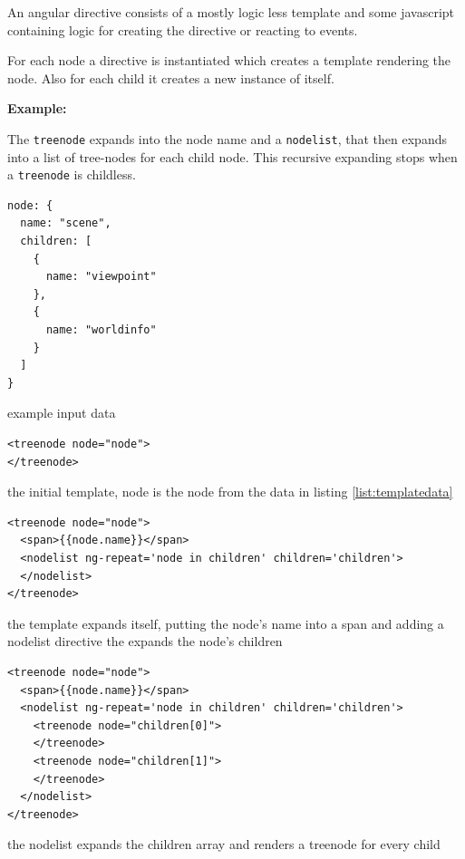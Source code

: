 An angular directive consists of a mostly logic less template and some
javascript containing logic for creating the directive or reacting to
events.

For each node a directive is instantiated which creates a template
rendering the node. Also for each child it creates a new instance of
itself.

\textbf{Example:}

The \texttt{treenode} expands into the node name and a \texttt{nodelist},
that then expands into a list of tree-nodes for each child node.
This recursive expanding stops when a \texttt{treenode} is childless.

\begin{listing}[H]
  \begin{verbatim}
node: {
  name: "scene",
  children: [
    {
      name: "viewpoint"
    },
    {
      name: "worldinfo"
    }
  ]
}
  \end{verbatim}
  \caption{example input data}
  \label{list:templatedata}
\end{listing}

\begin{listing}[H]
  \begin{verbatim}
<treenode node="node">
</treenode>
  \end{verbatim}
  \caption{the initial template, node is the node from the data in listing \ref{list:templatedata}}
\end{listing}

\begin{listing}[H]
  \begin{verbatim}
<treenode node="node">
  <span>{{node.name}}</span>
  <nodelist ng-repeat='node in children' children='children'>
  </nodelist>
</treenode>
  \end{verbatim}
  \caption{the template expands itself, putting the node's name into a span and adding a nodelist directive the expands the node's children}
\end{listing}

\begin{listing}[H]
  \begin{verbatim}
<treenode node="node">
  <span>{{node.name}}</span>
  <nodelist ng-repeat='node in children' children='children'>
    <treenode node="children[0]">
    </treenode>
    <treenode node="children[1]">
    </treenode>
  </nodelist>
</treenode>
  \end{verbatim}
  \caption{the nodelist expands the children array and renders a treenode for every child}
\end{listing}

